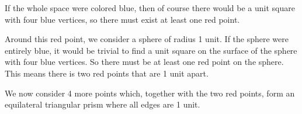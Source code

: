 \documentclass[12pt]{article}
\begin{document}
If the whole space were colored blue, then of course there would be a unit square with four blue vertices, so there must exist at least one red point.
\begin{center}
\end{center}

Around this red point, we consider a sphere of radius 1 unit. If the sphere were entirely blue, it would be trivial to find a unit square on the surface of the sphere with four blue vertices. So there must be at least one red point on the sphere. This means there is two red points that are 1 unit apart.
\begin{center}
\end{center}

We now consider 4 more points which, together with the two red points, form an equilateral triangular prism where all edges are 1 unit.
\begin{center}
\end{center}
\end{document}
